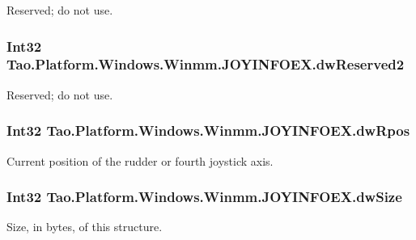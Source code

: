 Reserved; do not use. 

\hypertarget{struct_tao_1_1_platform_1_1_windows_1_1_winmm_1_1_j_o_y_i_n_f_o_e_x_a4636a7f59c4c68823da45e1479b93982}{
\subsubsection[{dwReserved2}]{\setlength{\rightskip}{0pt plus 5cm}Int32 {\bf Tao.Platform.Windows.Winmm.JOYINFOEX.dwReserved2}}}
\label{struct_tao_1_1_platform_1_1_windows_1_1_winmm_1_1_j_o_y_i_n_f_o_e_x_a4636a7f59c4c68823da45e1479b93982}


Reserved; do not use. 

\hypertarget{struct_tao_1_1_platform_1_1_windows_1_1_winmm_1_1_j_o_y_i_n_f_o_e_x_a2a0b00a8a2d2e3f4b19da855910baa2a}{
\subsubsection[{dwRpos}]{\setlength{\rightskip}{0pt plus 5cm}Int32 {\bf Tao.Platform.Windows.Winmm.JOYINFOEX.dwRpos}}}
\label{struct_tao_1_1_platform_1_1_windows_1_1_winmm_1_1_j_o_y_i_n_f_o_e_x_a2a0b00a8a2d2e3f4b19da855910baa2a}


Current position of the rudder or fourth joystick axis. 

\hypertarget{struct_tao_1_1_platform_1_1_windows_1_1_winmm_1_1_j_o_y_i_n_f_o_e_x_a074961de65f35479935c31054377637d}{
\subsubsection[{dwSize}]{\setlength{\rightskip}{0pt plus 5cm}Int32 {\bf Tao.Platform.Windows.Winmm.JOYINFOEX.dwSize}}}
\label{struct_tao_1_1_platform_1_1_windows_1_1_winmm_1_1_j_o_y_i_n_f_o_e_x_a074961de65f35479935c31054377637d}


Size, in bytes, of this structure. 

